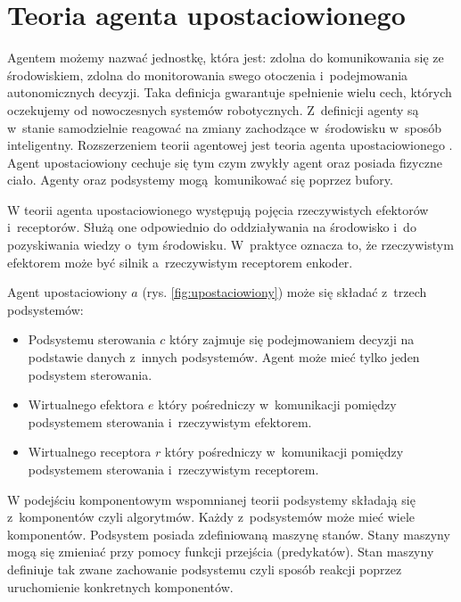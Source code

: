 \section{Teoria agenta upostaciowionego}
Agentem możemy nazwać jednostkę, która jest: zdolna do komunikowania się ze środowiskiem, zdolna do monitorowania swego otoczenia i~podejmowania autonomicznych decyzji. Taka definicja gwarantuje spełnienie wielu cech, których oczekujemy od nowoczesnych systemów robotycznych. Z~definicji agenty są w~stanie samodzielnie reagować na zmiany zachodzące w~środowisku w~sposób inteligentny. Rozszerzeniem teorii agentowej jest teoria agenta upostaciowionego \cite{bib:agent1} \cite{bib:agent2}. Agent upostaciowiony cechuje się tym czym zwykły agent oraz posiada fizyczne ciało. Agenty oraz podsystemy mogą komunikować się poprzez bufory.


W teorii agenta upostaciowionego występują pojęcia rzeczywistych efektorów i~receptorów. Służą one odpowiednio do oddziaływania na środowisko i~do pozyskiwania wiedzy o~tym środowisku. W~praktyce oznacza to, że rzeczywistym efektorem może być silnik a~rzeczywistym receptorem enkoder. 

Agent upostaciowiony $a$  (rys. \ref{fig:upostaciowiony}) może się składać z~trzech podsystemów:
\begin{itemize}
	\item Podsystemu sterowania $c$ który zajmuje się podejmowaniem decyzji na podstawie danych z~innych podsystemów. Agent może mieć tylko jeden podsystem sterowania.
	\item Wirtualnego efektora $e$ który pośredniczy w~komunikacji pomiędzy podsystemem sterowania i~rzeczywistym efektorem.
	\item Wirtualnego receptora $r$ który pośredniczy w~komunikacji pomiędzy podsystemem sterowania i~rzeczywistym receptorem.
\end{itemize}

W podejściu komponentowym wspomnianej teorii podsystemy składają się z~komponentów czyli algorytmów. Każdy z~podsystemów może mieć wiele komponentów. Podsystem posiada zdefiniowaną maszynę stanów. Stany maszyny mogą się zmieniać przy pomocy funkcji przejścia (predykatów). Stan maszyny definiuje tak zwane zachowanie podsystemu czyli sposób reakcji poprzez uruchomienie konkretnych komponentów. 

